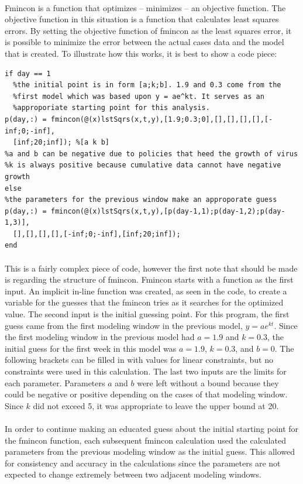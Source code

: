 \documentclass[12pt]{article}
\begin{document}
\paragraph{} Fmincon is a function that optimizes – minimizes – an objective function. The objective function in this situation is a function that calculates least squares errors. By setting the objective function of fmincon as the least squares error, it is possible to minimize the error between the actual cases data and the model that is created. To illustrate how this works, it is best to show a code piece:
\begin{lstlisting}
if day == 1
  %the initial point is in form [a;k;b]. 1.9 and 0.3 come from the
  %first model which was based upon y = ae^kt. It serves as an
  %approporiate starting point for this analysis.
p(day,:) = fmincon(@(x)lstSqrs(x,t,y),[1.9;0.3;0],[],[],[],[],[-inf;0;-inf],
  [inf;20;inf]); %[a k b]
%a and b can be negative due to policies that heed the growth of virus
%k is always positive because cumulative data cannot have negative growth
else
%the parameters for the previous window make an approporate guess
p(day,:) = fmincon(@(x)lstSqrs(x,t,y),[p(day-1,1);p(day-1,2);p(day-1,3)],
  [],[],[],[],[-inf;0;-inf],[inf;20;inf]);
end
\end{lstlisting}
\paragraph{} This is a fairly complex piece of code, however the first note that should be made is regarding the structure of fmincon. Fmincon starts with a function as the first input. An implicit in-line function was created, as seen in the code, to create a variable for the guesses that the fmincon tries as it searches for the optimized value. The second input is the initial guessing point. For this program, the first guess came from the first modeling window in the previous model, $y = ae ^ {kt}$. Since the first modeling window in the previous model had $a = 1.9$ and $k = 0.3$, the initial guess for the first week in this model was $a = 1.9$, $k = 0.3$, and $b = 0$. The following brackets can be filled in with values for linear constraints, but no constraints were used in this calculation. The last two inputs are the limits for each parameter. Parameters $a$ and $b$ were left without a bound because they could be negative or positive depending on the cases of that modeling window. Since $k$ did not exceed 5, it was appropriate to leave the upper bound at 20.
\paragraph{} In order to continue making an educated guess about the initial starting point for the fmincon function, each subsequent fmincon calculation used the calculated parameters from the previous modeling window as the initial guess. This allowed for consistency and accuracy in the calculations since the parameters are not expected to change extremely between two adjacent modeling windows.
\end{document}
